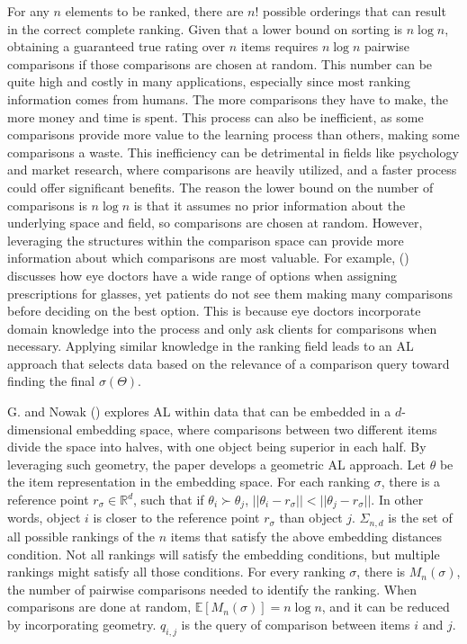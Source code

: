 \documentclass[
  letterpaper,
  numbers=noenddot,
  DIV=11]{scrreprt}
\theoremstyle{plain}
\theoremstyle{definition}
\theoremstyle{remark}
\begin{document}
For any \(n\) elements to be ranked, there are \(n!\) possible orderings
that can result in the correct complete ranking. Given that a lower
bound on sorting is \(n\log n\), obtaining a guaranteed true rating over
\(n\) items requires \(n\log n\) pairwise comparisons if those
comparisons are chosen at random. This number can be quite high and
costly in many applications, especially since most ranking information
comes from humans. The more comparisons they have to make, the more
money and time is spent. This process can also be inefficient, as some
comparisons provide more value to the learning process than others,
making some comparisons a waste. This inefficiency can be detrimental in
fields like psychology and market research, where comparisons are
heavily utilized, and a faster process could offer significant benefits.
The reason the lower bound on the number of comparisons is \(n\log n\)
is that it assumes no prior information about the underlying space and
field, so comparisons are chosen at random. However, leveraging the
structures within the comparison space can provide more information
about which comparisons are most valuable. For example,
() discusses how eye doctors
have a wide range of options when assigning prescriptions for glasses,
yet patients do not see them making many comparisons before deciding on
the best option. This is because eye doctors incorporate domain
knowledge into the process and only ask clients for comparisons when
necessary. Applying similar knowledge in the ranking field leads to an
AL approach that selects data based on the relevance of a comparison
query toward finding the final \(\sigma(\Theta)\).

G. and Nowak () explores AL within data
that can be embedded in a \(d\)-dimensional embedding space, where
comparisons between two different items divide the space into halves,
with one object being superior in each half. By leveraging such
geometry, the paper develops a geometric AL approach. Let \(\theta\) be
the item representation in the embedding space. For each ranking
\(\sigma\), there is a reference point \(r_{\sigma} \in \mathbb{R}^d\),
such that if \(\theta_{i} \succ \theta_{j}\),
\(||\theta_i - r_{\sigma}|| < ||\theta_j - r_{\sigma}||\). In other
words, object \(i\) is closer to the reference point \(r_{\sigma}\) than
object \(j\). \(\Sigma_{n,d}\) is the set of all possible rankings of
the \(n\) items that satisfy the above embedding distances condition.
Not all rankings will satisfy the embedding conditions, but multiple
rankings might satisfy all those conditions. For every ranking
\(\sigma\), there is \(M_n(\sigma)\), the number of pairwise comparisons
needed to identify the ranking. When comparisons are done at random,
\(\mathbb{E}[M_n(\sigma)] = n\log n\), and it can be reduced by
incorporating geometry. \(q_{i,j}\) is the query of comparison between
items \(i\) and \(j\).
\end{document}
